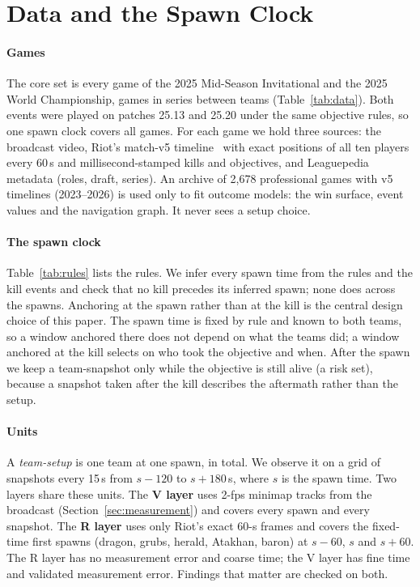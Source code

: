 \section{Data and the Spawn Clock}
\label{sec:data}


\paragraph*{Games}
The core set is every game of the 2025 Mid-Season Invitational and the 2025 World Championship,  games in  series between  teams (Table~\ref{tab:data}).
Both events were played on patches 25.13 and 25.20 under the same objective rules, so one spawn clock covers all games.
For each game we hold three sources: the broadcast video, Riot's match-v5 timeline~\cite{riotapi} with exact positions of all ten players every 60\,s and millisecond-stamped kills and objectives, and Leaguepedia~\cite{leaguepedia} metadata (roles, draft, series).
An archive of 2,678 professional games with v5 timelines (2023--2026) is used only to fit outcome models: the win surface, event values and the navigation graph.
It never sees a setup choice.

\paragraph*{The spawn clock}
Table~\ref{tab:rules} lists the rules.
We infer every spawn time from the rules and the kill events and check that no kill precedes its inferred spawn; none does across the  spawns.
Anchoring at the spawn rather than at the kill is the central design choice of this paper.
The spawn time is fixed by rule and known to both teams, so a window anchored there does not depend on what the teams did; a window anchored at the kill selects on who took the objective and when.
After the spawn we keep a team-snapshot only while the objective is still alive (a risk set), because a snapshot taken after the kill describes the aftermath rather than the setup.

\paragraph*{Units}
A \emph{team-setup} is one team at one spawn,  in total.
We observe it on a grid of snapshots every 15\,s from $s{-}120$ to $s{+}180$\,s, where $s$ is the spawn time.
Two layers share these units.
The \textbf{V layer} uses 2-fps minimap tracks from the broadcast (Section~\ref{sec:measurement}) and covers every spawn and every snapshot.
The \textbf{R layer} uses only Riot's exact 60-s frames and covers the fixed-time first spawns (dragon, grubs, herald, Atakhan, baron) at $s{-}60$, $s$ and $s{+}60$.
The R layer has no measurement error and coarse time; the V layer has fine time and validated measurement error.
Findings that matter are checked on both.

